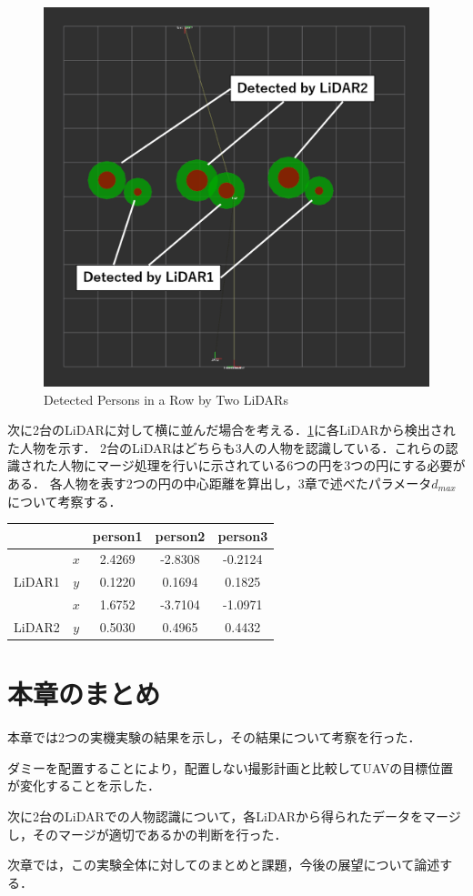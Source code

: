 \documentclass[autodetect-engine,dvipdfmx-if-dvi,ja=standard,a4j,jbase=11pt,magstyle=nomag*]{bxjsreport}
\begin{document}
\begin{figure}[h]
    \centering
    \includegraphics[width=0.5\linewidth, clip]{./figure/chapter5/row.png}
    \caption{Detected Persons in a Row by Two LiDARs}
    \label{fig:row}
\end{figure}

次に2台のLiDARに対して横に並んだ場合を考える．\cref{fig:row}に各LiDARから検出された人物を示す．
2台のLiDARはどちらも3人の人物を認識している．これらの認識された人物にマージ処理を行いに示されている6つの円を3つの円にする必要がある．
各人物を表す2つの円の中心距離を算出し，3章で述べたパラメータ$d_{max}$について考察する．

\begin{table}[h]
  \centering
  \begin{tabular}{|c|c|c|c|c|} \hline
	\multicolumn{2}{|c|}{} & \multicolumn{1}{|c|}{person1} & \multicolumn{1}{|c|}{person2} & \multicolumn{1}{|c|}{person3}\\ \hline \hline
	& $x$ & 2.4269 & -2.8308 &  -0.2124 \\ \cline{2-5}
	LiDAR1 & $y$ &  0.1220 & 0.1694 &  0.1825 \\ \hline
	& $x$ & 1.6752 & -3.7104 & -1.0971 \\ \cline{2-5}
	LiDAR2 & $y$ &  0.5030 & 0.4965 &  0.4432 \\ \hline
 \end{tabular}
\end{table}
\section{本章のまとめ}
本章では2つの実機実験の結果を示し，その結果について考察を行った．

ダミーを配置することにより，配置しない撮影計画と比較してUAVの目標位置が変化することを示した．

次に2台のLiDARでの人物認識について，各LiDARから得られたデータをマージし，そのマージが適切であるかの判断を行った．

次章では，この実験全体に対してのまとめと課題，今後の展望について論述する．
\end{document}
